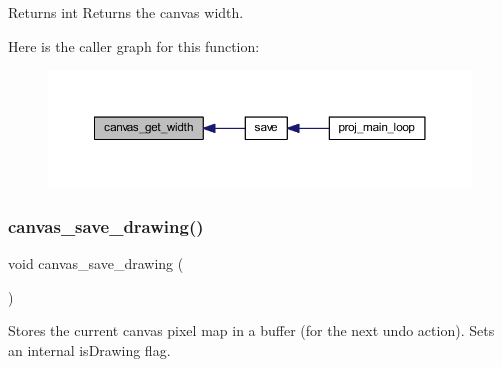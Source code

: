 \begin{DoxyReturn}{Returns}
int Returns the canvas width. 
\end{DoxyReturn}
Here is the caller graph for this function\+:\nopagebreak
\begin{figure}[H]
\begin{center}
\leavevmode
\includegraphics[width=350pt]{group__canvas_gaa5703f24ea2a8ec8bee2c73225c39553_icgraph}
\end{center}
\end{figure}
\mbox{\label{group__canvas_ga3c9ed75a75ae36bc6fc7591952fccf17}} 
\subsubsection{\texorpdfstring{canvas\+\_\+save\+\_\+drawing()}{canvas\_save\_drawing()}}
{\footnotesize\ttfamily void canvas\+\_\+save\+\_\+drawing (\begin{DoxyParamCaption}{ }\end{DoxyParamCaption})}



Stores the current canvas pixel map in a buffer (for the next undo action). Sets an internal is\+Drawing flag. 

